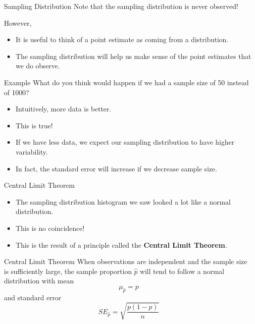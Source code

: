 \begin{frame}{Sampling Distribution}
    Note that the sampling distribution is never observed! 
    
    \vspace{12pt}However,
    \begin{itemize}
        \item It is useful to think of a point estimate as coming from a distribution.
        \item The sampling distribution will help us make sense of the point estimates that we do observe.
    \end{itemize}
\end{frame}

\begin{frame}{Example}
    What do you think would happen if we had a sample size of 50 instead of 1000?
    
    \begin{itemize}
        \item Intuitively, more data is better.
        \item This is true!
        \item If we have less data, we expect our sampling distribution to have higher variability.
        \item In fact, the standard error will increase if we decrease sample size.
    \end{itemize}
\end{frame}

\begin{frame}{Central Limit Theorem}
    \begin{itemize}
        \item The sampling distribution histogram we saw looked a lot like a normal distribution.
        \item This is no coincidence!
        \item This is the result of a principle called the \textbf{Central Limit Theorem}.
    \end{itemize}
\end{frame}

\begin{frame}{Central Limit Theorem}
    When observations are independent and the sample size is sufficiently large, the sample proportion $\hat{p}$ will tend to follow a normal distribution with mean
    \[
        \mu_{\hat{p}} = p
    \]
    and standard error
    \[
        SE_{\hat{p}} = \sqrt{\frac{p(1-p)}{n}}
    \]
\end{frame}

